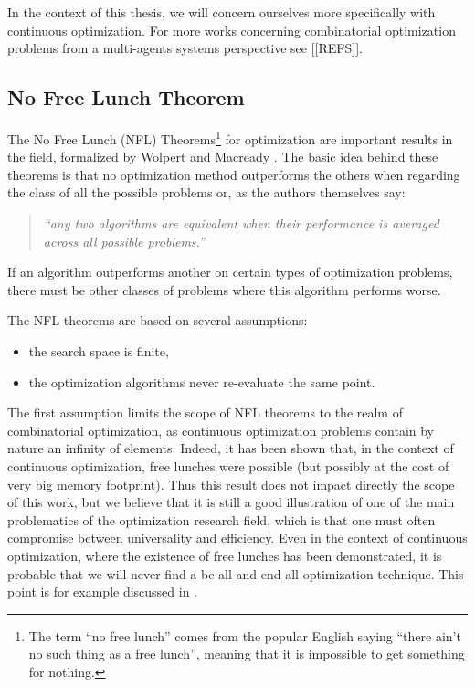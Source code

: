 In the context of this thesis, we will concern ourselves more specifically with continuous optimization. For more works concerning combinatorial optimization problems from a multi-agents systems perspective see [[REFS]].

\subsection{No Free Lunch Theorem}

The No Free Lunch (NFL) Theorems\footnote{The term \enquote{no free lunch} comes from the popular English saying \enquote{there ain't no such thing as a free lunch}, meaning that it is impossible to get something for nothing.} for optimization are important results in the field, formalized by Wolpert and Macready \cite{585893}. The basic idea behind these theorems is that no optimization method outperforms the others when regarding the class of all the possible problems or, as the authors themselves say:
\begin{quote}\textit{
\enquote{any two algorithms are equivalent when their performance is averaged across all possible problems.}}
\end{quote}
If an algorithm outperforms another on certain types of optimization problems, there must be other classes of problems where this algorithm performs worse.

The NFL theorems are based on several assumptions:
\begin{itemize}

\item the search space is finite,

\item the optimization algorithms never re-evaluate the same point.

\end{itemize}

The first assumption limits the scope of NFL theorems to the realm of combinatorial optimization, as continuous optimization problems contain by nature an infinity of elements. Indeed, it has been shown that, in the context of continuous optimization, free lunches were possible \cite{Auger-s00453-008-9244-5} (but possibly at the cost of very big memory footprint). Thus this result does not impact directly the scope of this work, but we believe that it is still a good illustration of one of the main problematics of the optimization research field, which is that one must often compromise between universality and efficiency. Even in the context of continuous optimization, where the existence of free lunches has been demonstrated, it is probable that we will never find a be-all and end-all optimization technique. This point is for example discussed in \cite{Doe05}.


